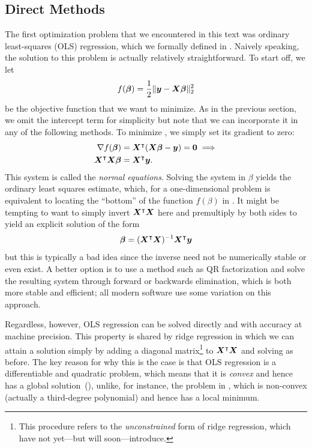 \subsection{Direct Methods}

The first optimization problem that we encountered in this text was ordinary least-squares (OLS) regression, which we formally defined in . Naively speaking, the solution to this problem is actually relatively straightforward. To start off, we let
\begin{equation}
  \label{eq:ols-obj}
  f(\boldsymbol{\beta}) = \frac{1}{2}\lVert \boldsymbol{y} - \boldsymbol{X}\boldsymbol{\beta}\rVert_2^2
\end{equation}
be the objective function that we want to minimize. As in the previous section, we omit the intercept term for simplicity but note that we can incorporate it in any of the following methods. To minimize , we simply set its gradient to zero:
\[
  \begin{aligned}
    \nabla f(\boldsymbol{\beta})                & = \boldsymbol{X}^\intercal (\boldsymbol{X}\boldsymbol{\beta} - \boldsymbol{y}) = \boldsymbol{0} \implies \\
    \boldsymbol{X}^\intercal \boldsymbol{X}\boldsymbol{\beta} & = \boldsymbol{X}^\intercal \boldsymbol{y}.
  \end{aligned}
\]
This system is called the \emph{normal equations}. Solving the system in \(\beta\) yields the ordinary least squares estimate, which, for a one-dimensional problem is equivalent to locating the ``bottom'' of the function \(f(\beta)\) in . It might be tempting to want to simply invert \(\boldsymbol{X}^\intercal\boldsymbol{X}\) here and premultiply by both sides to yield an explicit solution of the form
\[
  \boldsymbol{\beta} = (\boldsymbol{X}^\intercal\boldsymbol{X})^{-1}\boldsymbol{X}^\intercal\boldsymbol{y}
\]
but this is typically a bad idea since the inverse need not be numerically stable or even exist. A better option is to use a method such as QR factorization and solve the resulting system through forward or backwards elimination, which is both more stable and efficient; all modern software use some variation on this approach.

Regardless, however, OLS regression can be solved directly and with accuracy at machine precision. This property is shared by ridge regression in which we can attain a solution simply by adding a diagonal matrix\footnote{This procedure refers to the \emph{unconstrained} form of ridge regression, which have not yet---but will soon---introduce.} to \(\boldsymbol{X}^\intercal\boldsymbol{X}\) and solving as before. The key reason for why this is the case is that OLS regression is a differentiable and quadratic problem, which means that it is \emph{convex} and hence has a global solution~(), unlike, for instance, the problem in , which is non-convex (actually a third-degree polynomial) and hence has a local minimum.

